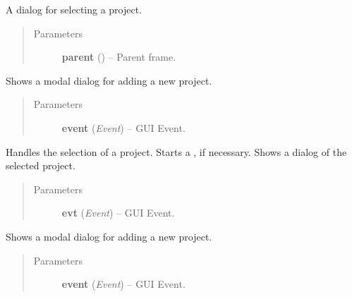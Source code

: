 \documentclass[letterpaper,10pt,english]{sphinxmanual}
\begin{document}
\begin{fulllineitems}
\label{wos:wos.ProjectSelectDialog}
A dialog for selecting a project.
\begin{quote}\begin{description}
\item[{Parameters}] \leavevmode
\textbf{parent} () -- Parent frame.

\end{description}\end{quote}

\begin{fulllineitems}
\label{wos:wos.ProjectSelectDialog.AddEvent}
Shows a modal dialog for adding a new project.
\begin{quote}\begin{description}
\item[{Parameters}] \leavevmode
\textbf{event} (\emph{Event}) -- GUI Event.

\end{description}\end{quote}

\end{fulllineitems}


\begin{fulllineitems}
\label{wos:wos.ProjectSelectDialog.DelEvent}
Handles the selection of a project.
Starts a {\hyperref[wos:wos.CURRENT_PROJECT]{}}, if necessary.
Shows a dialog of the selected project.
\begin{quote}\begin{description}
\item[{Parameters}] \leavevmode
\textbf{evt} (\emph{Event}) -- GUI Event.

\end{description}\end{quote}

\end{fulllineitems}


\begin{fulllineitems}
\label{wos:wos.ProjectSelectDialog.EditEvent}
Shows a modal dialog for adding a new project.
\begin{quote}\begin{description}
\item[{Parameters}] \leavevmode
\textbf{event} (\emph{Event}) -- GUI Event.


\end{description}
\end{quote}
\end{fulllineitems}
\end{fulllineitems}
\end{document}
